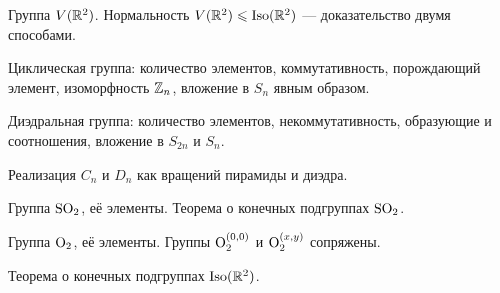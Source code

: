 \documentclass[a4paper]{extarticle}
\begin{document}
\begin{enumerate}
\itm Группа $V(\mathbb R^2)$. Нормальность $V(\mathbb R^2) \leqslant \operatorname{Iso} (\mathbb R^2)$ — доказательство двумя способами.

\itm Циклическая группа: количество элементов, коммутативность, порождающий элемент, изоморфность $\mathbb Z_n$, вложение в $S_n$ явным образом.

\itm Диэдральная группа: количество элементов, некоммутативность, образующие и соотношения, вложение в $S_{2n}$ и $S_n$.

\itm Реализация $C_n$ и $D_n$ как вращений пирамиды и диэдра.

\itm Группа $\mathrm{SO}_2$, её элементы. Теорема о конечных подгруппах $\mathrm{SO}_2$.

\itm Группа $\mathrm O_2$, её элементы. Группы $\mathrm O_2^{(0,0)}$ и $\mathrm O_2^{(x,y)}$ сопряжены.

\itm Теорема о конечных подгруппах $\operatorname{Iso} (\mathbb R^2)$.








\end{enumerate}
\end{document}
